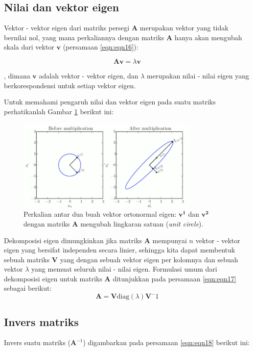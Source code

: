 \subsection{Nilai dan vektor eigen}
Vektor - vektor eigen dari matriks persegi $\mathbf{A}$ merupakan vektor yang tidak bernilai nol, yang mana perkaliannya dengan matriks $\mathbf{A}$ hanya akan mengubah skala dari vektor $\mathbf{v}$ (persamaan \ref{eqn:eqn16}):

\begin{dmath}\label{eqn:eqn16}
    \mathbf{Av} = \lambda \mathbf{v}
\end{dmath}

, dimana $\textbf{v}$ adalah vektor - vektor eigen, dan $\lambda$ merupakan nilai - nilai eigen yang berkorespondensi untuk setiap vektor eigen.


Untuk memahami pengaruh nilai dan vektor eigen pada suatu matriks perhatikanlah Gambar \ref{fig:fig2} berikut ini:
\begin{figure}[H]
    \centering
    \includegraphics[width=0.8\textwidth]{gambar/gmb2.png}
    \caption{Perkalian antar dua buah vektor ortonormal eigen: $\mathbf{v^1}$ dan $\mathbf{v^2}$ dengan matriks $\mathbf{A}$ mengubah lingkaran satuan (\textit{unit circle}).}
    \label{fig:fig2}
\end{figure}

Dekomposisi eigen dimungkinkan jika matriks $\mathbf{A}$ mempunyai $n$ vektor - vektor eigen yang bersifat independen secara linier, sehingga kita dapat membentuk sebuah matriks $\mathbf{V}$ yang dengan sebuah vektor eigen per kolomnya dan sebuah vektor $\lambda$ yang memuat seluruh nilai - nilai eigen. Formulasi umum dari dekomposisi eigen untuk matriks $\mathbf{A}$ ditunjukkan pada persamaan \ref{eqn:eqn17} sebagai berikut:
\begin{equation}\label{eqn:eqn17}
    \mathbf{A} = \mathbf{V}\text{diag}(\lambda)\mathbf{V}^-1
\end{equation}

\subsection{Invers matriks}
Invers suatu matriks ($\mathbf{A}^{-1}$) digambarkan pada persamaan \ref{eqn:eqn18} berikut ini:

